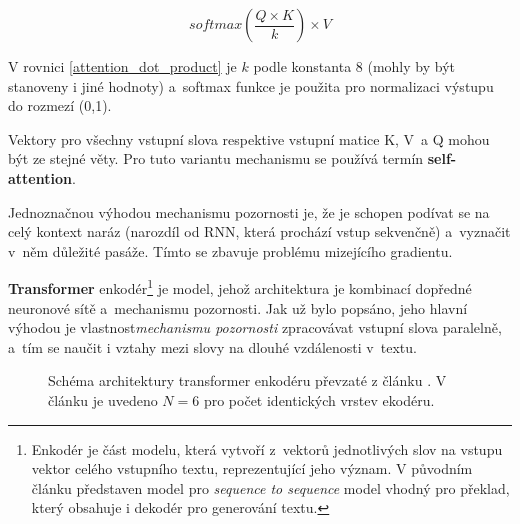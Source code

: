 \begin{equation}
    \label{attention_dot_product}
    softmax(\frac{Q \times K}{k})\times V
\end{equation}

V rovnici \ref{attention_dot_product} je $k$ podle \cite{Transformers} konstanta 8 (mohly by být stanoveny i jiné hodnoty) a~softmax funkce je použita pro normalizaci výstupu do rozmezí (0,1).\par
Vektory pro všechny vstupní slova respektive vstupní matice K, V~a Q mohou být ze stejné věty. Pro tuto variantu mechanismu se používá termín \textbf{self-attention}.\par 
Jednoznačnou výhodou mechanismu pozornosti je, že je schopen podívat se na celý kontext naráz (narozdíl od RNN, která prochází vstup sekvenčně) a~vyznačit v~něm důležité pasáže. Tímto se zbavuje problému mizejícího gradientu.\par\medskip

\textbf{Transformer} enkodér\footnote{Enkodér je část modelu, která vytvoří z~vektorů jednotlivých slov na vstupu vektor celého vstupního textu, reprezentující jeho význam. V původním článku \cite{Transformers} představen model pro \emph{sequence to sequence} model vhodný pro překlad, který obsahuje i dekodér pro generování textu.} je model, jehož architektura je kombinací dopředné neuronové sítě a~mechanismu pozornosti. Jak už bylo popsáno, jeho hlavní výhodou je vlastnost\linebreak \emph{mechanismu pozornosti} zpracovávat vstupní slova paralelně, a~tím se naučit i vztahy mezi slovy na dlouhé vzdálenosti v~textu.\par

\begin{figure}[hbt]
    \centering
	\caption{Schéma architektury transformer enkodéru převzaté z článku \cite{Transformers}. V článku je uvedeno $N=6$ pro počet identických vrstev ekodéru. }
	\label{transformer_encoder}
\end{figure}

